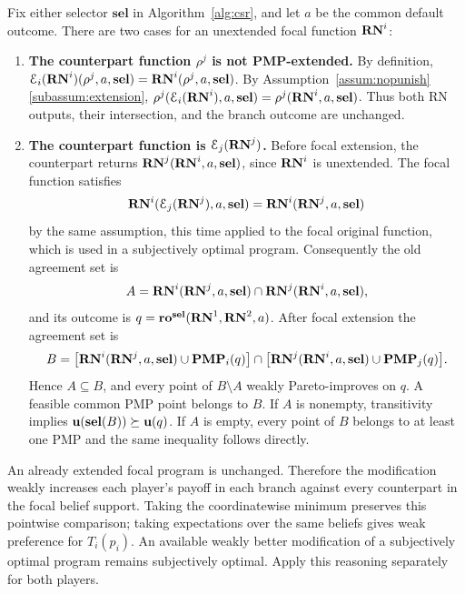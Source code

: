 \documentclass[sigconf]{aamas}
\newcommand{\selection}{sel}%
\newcommand{\renegb}{\mathbf{\selection}}
\theoremstyle{definition}
\begin{document}
Fix either selector $\renegb$ in Algorithm~\ref{alg:csr}, and let $a$
be the common default outcome. There are two cases for an unextended
focal function $\mathbf{RN}^{i}$:
\begin{enumerate}
 \item \textbf{The counterpart function $\rho^j$ is not PMP-extended.}
 By definition,
 $\mathcal E_i(\renegi)(\rho^j,a,\renegb)=\renegi(\rho^j,a,\renegb)$.
 By Assumption~\ref{assum:nopunish}\ref{subassum:extension},
 $\rho^j(\mathcal E_i(\renegi),a,\renegb)=\rho^j(\renegi,a,\renegb)$.
 Thus both RN outputs, their intersection, and the branch outcome
 are unchanged.

 \item \textbf{The counterpart function is $\mathcal E_j(\mathbf{RN}^{j})$.}
 Before focal extension, the counterpart returns
 $\renegj(\renegi,a,\renegb)$, since $\mathbf{RN}^{i}$ is unextended.
 The focal function satisfies
 \[
   \renegi(\mathcal E_j(\renegj),a,\renegb)
      =\renegi(\renegj,a,\renegb)
 \]
 by the same assumption, this time applied to the focal original
 function, which is used in a subjectively optimal program.
 Consequently the old agreement set is
 \[
 A=\renegi(\renegj,a,\renegb)\cap\renegj(\renegi,a,\renegb),
 \]
 and its outcome is
 $q=\bargdefault^{\renegb}(\renegone,\renegtwo,a)$.
 After focal extension the agreement set is
 \[
 B=\bigl[\renegi(\renegj,a,\renegb)\cup\yudproji(q)\bigr]
    \cap\bigl[\renegj(\renegi,a,\renegb)\cup\yudprojj(q)\bigr].
 \]
 Hence $A\subseteq B$, and every point of $B\setminus A$ weakly
 Pareto-improves on $q$. A feasible common PMP point belongs to $B$.
 If $A$ is nonempty, transitivity implies
 $\fullpay(\renegb(B))\succeq\fullpay(q)$.
 If $A$ is empty, every point of $B$ belongs to at least one PMP and
 the same inequality follows directly.
\end{enumerate}
An already extended focal program is unchanged. Therefore the
modification weakly increases each player's payoff in each branch
against every counterpart in the focal belief support. Taking the
coordinatewise minimum preserves this pointwise comparison; taking
expectations over the same beliefs gives weak preference for $T_i(p_i)$.
An available weakly better modification of a subjectively optimal
program remains subjectively optimal. Apply this reasoning separately
for both players.
\end{document}
